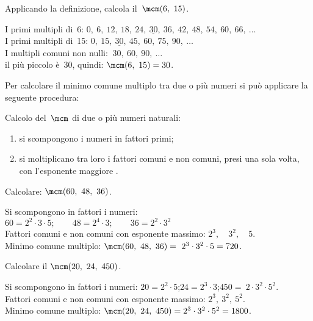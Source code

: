 \begin{esempio}{}{}
Applicando la definizione, calcola il~\(\mcm(6,~15)\).

I primi multipli di~6: \quad 
\(0,~6,~12,~18,~24,~\underline{30},~36,~42,~48,~54,~60,~66,~\dots\)\\
I primi multipli di~15: \quad 
\(0,~15,~\underline{30},~45,~60,~75,~90,~\dots\)\\
I multipli comuni non nulli: \quad \(~30,~60,~90,~\dots\)\\
il più piccolo è~30, quindi: \quad \(\mcm(6,~15) = 30\). 
\end{esempio}

Per calcolare il minimo comune multiplo tra due o più numeri si può 
applicare la seguente procedura:

\begin{procedura}{}{}
Calcolo del~\(\mcm\) di due o più numeri naturali:
\begin{enumerate}[noitemsep, label=(\alph*)]
 \item si scompongono i numeri in fattori primi;
 \item si moltiplicano tra loro i fattori comuni e non comuni, 
  presi una sola volta, con l'esponente maggiore .
\end{enumerate}
\end{procedura}

\begin{esempio}{}{}
Calcolare: \quad \(\mcm(60,~48,~36)\).

Si scompongono in fattori i numeri: \\
\(60 = 2^2 \cdot 3 \cdot 5; 
  \qquad 48 = 2^4 \cdot 3; 
  \qquad 36 = 2^2 \cdot 3^2\)\\
Fattori comuni e non comuni con esponente massimo: 
\(2^3,\quad 3^2, \quad 5\).\\ 
Minimo comune multiplo: \quad 
\(\mcm(60,~48,~36)=~2^3 \cdot 3^2 \cdot 5 = 720\).
\end{esempio}

\begin{esempio}{}{}
Calcolare il \quad \(\mcm(20,~24,~450)\).

Si scompongono in fattori i numeri: \quad
\(20=2^2\cdot5\);\quad\(24=2^3\cdot3\);\quad\(450 =~2\cdot3^2\cdot5^2\).\\
Fattori comuni e non comuni con esponente massimo: 
\(2^3,~3^2,~5^ 2\).\\
Minimo comune multiplo: \quad 
\(\mcm(20,~24,~450) = 2^3 \cdot 3^2 \cdot 5^ 2 = 1800\).
\end{esempio}

